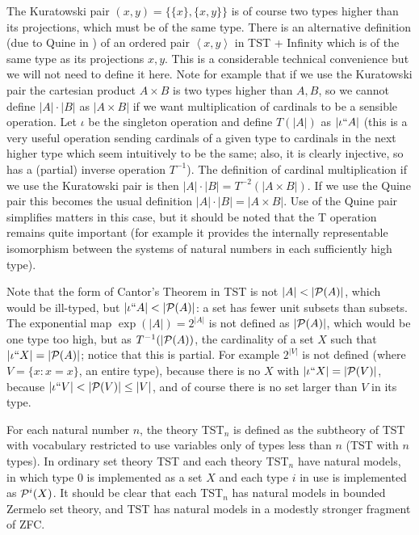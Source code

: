 \documentclass[112pt]{article}
\begin{document}
The Kuratowski pair $(x,y) = \{\{x\},\{x,y\}\}$ is of course two types higher than its projections, which must be of the same type.  There is an alternative definition (due to Quine in \cite{quinepair}) of an ordered pair
$\left< x,y\right>$ in TST + Infinity which is of the same type as its projections $x,y$.  This is a considerable technical convenience but we will not need to define it here.  Note for example that if we use the Kuratowski pair the cartesian product $A \times B$ is two types higher than $A,B$, so we cannot define $|A| \cdot |B|$ as $|A \times B|$ if we want multiplication of cardinals to be a sensible operation.  Let $\iota$ be the singleton operation and define $T(|A|)$ as $|\iota``A|$ (this is a very useful operation sending cardinals of a given type to cardinals in the next higher type which seem intuitively to be the same; also, it is clearly injective, so has a (partial) inverse operation $T^{-1}$).  The definition of cardinal multiplication if we use the Kuratowski pair is then $|A| \cdot |B| =T^{-2}(|A\times B|)$.  If we use the Quine pair this becomes the usual definition $|A| \cdot |B| =|A\times B|$.  Use of the Quine pair simplifies matters in this case, but it should be noted that the T operation remains quite important (for example it provides the internally representable isomorphism between the systems of natural numbers in each sufficiently high type).

Note that the form of Cantor's Theorem in TST is not $|A| < |{\cal P}(A)|$, which would be ill-typed, but $|\iota``A|<|{\cal P}(A)|$:  a set has fewer unit subsets than subsets.  The exponential map $\exp(|A|) = 2^{|A|}$ is not defined as $|{\cal P}(A)|$, which would be one type too high, but as $T^{-1}(|{\cal P}(A))$, the cardinality of a set $X$ such that $|\iota``X| = |{\cal P}(A)|$;   notice that this is partial.  For example
$2^{|V|}$ is not defined (where $V=\{x:x=x\}$, an entire type), because there is no $X$ with $|\iota``X|=|{\cal P}(V)|$, because $|\iota``V|<|{\cal P}(V)| \leq |V|$, and of course there is no set larger than $V$ in its type.

For each natural number $n$, the theory TST$_n$ is defined as the subtheory of TST with vocabulary restricted to use variables only of types less than $n$ (TST with $n$ types).
In ordinary set theory TST and each theory TST$_n$ have natural models, in which type 0 is implemented as a set $X$ and each type $i$ in use is implemented as ${\cal P}^i(X)$.  It should be clear that each TST$_n$ has natural models in bounded Zermelo set theory, and TST has natural models in a modestly stronger fragment of ZFC.
\end{document}
